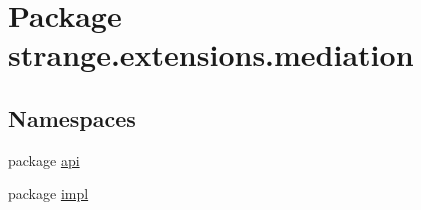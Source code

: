 \hypertarget{namespacestrange_1_1extensions_1_1mediation}{\section{Package strange.\-extensions.\-mediation}
\label{namespacestrange_1_1extensions_1_1mediation}
}
\subsection*{Namespaces}
\begin{DoxyCompactItemize}
\item 
package \hyperlink{namespacestrange_1_1extensions_1_1mediation_1_1api}{api}
\item 
package \hyperlink{namespacestrange_1_1extensions_1_1mediation_1_1impl}{impl}
\end{DoxyCompactItemize}
